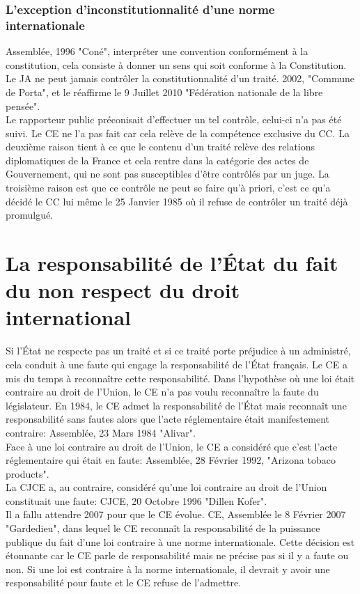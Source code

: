 \documentclass[10pt, a4paper, openany]{book}
\begin{document}
\subsubsection{L'exception d'inconstitutionnalité d'une norme internationale}

Assemblée, 1996 "Coné", interpréter une convention conformément à la constitution, cela consiste à donner un sens qui soit conforme à la Constitution. Le JA ne peut jamais contrôler la constitutionnalité d'un traité. 2002, "Commune de Porta", et le réaffirme le 9 Juillet 2010 "Fédération nationale de la libre pensée". \\
Le rapporteur public préconisait d'effectuer un tel contrôle, celui-ci n'a pas été suivi. Le CE ne l'a pas fait car cela relève de la compétence exclusive du CC. La deuxième raison tient à ce que le contenu d'un traité relève des relations diplomatiques de la France et cela rentre dans la catégorie des actes de Gouvernement, qui ne sont pas susceptibles d'être contrôlés par un juge. La troisième raison est que ce contrôle ne peut se faire qu'à priori, c'est ce qu'a décidé le CC lui même le 25 Janvier 1985 où il refuse de contrôler un traité déjà promulgué. 


\section{La responsabilité de l'État du fait du non respect du droit international}

Si l'État ne respecte pas un traité et si ce traité porte préjudice à un administré, cela conduit à une faute qui engage la responsabilité de l'État français. Le CE a mis du temps à reconnaître cette responsabilité. Dans l'hypothèse où une loi était contraire au droit de l'Union, le CE n'a pas voulu reconnaître la faute du législateur. En 1984, le CE admet la responsabilité de l'État mais reconnaît une responsabilité sans fautes alors que l'acte réglementaire était manifestement contraire: Assemblée, 23 Mars 1984 "Alivar". \\
Face à une loi contraire au droit de l'Union, le CE a considéré que c'est l'acte réglementaire qui était en faute: Assemblée, 28 Février 1992, "Arizona tobaco products". \\
La CJCE a, au contraire, considéré qu'une loi contraire au droit de l'Union constituait une faute: CJCE, 20 Octobre 1996 "Dillen Kofer". \\
Il a fallu attendre 2007 pour que le CE évolue. CE, Assemblée le 8 Février 2007 "Gardedieu", dans lequel le CE reconnaît la responsabilité de la puissance publique du fait d'une loi contraire à une norme internationale. Cette décision est étonnante car le CE parle de responsabilité mais ne précise pas si il y a faute ou non. Si une loi est contraire à la norme internationale, il devrait y avoir une responsabilité pour faute et le CE refuse de l'admettre. 
\end{document}
